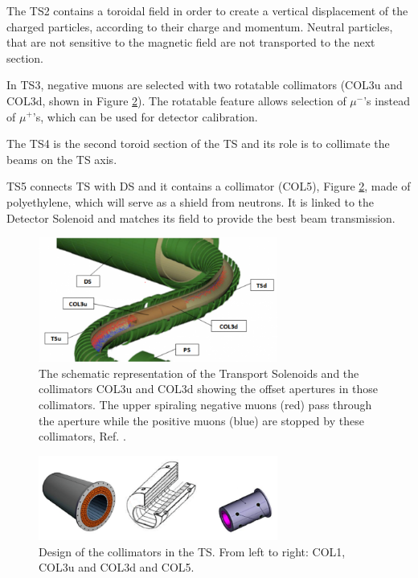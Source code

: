 The TS2 contains a toroidal field in order to create a 
vertical displacement of the charged particles,
according to their charge and momentum.
Neutral particles, that are not sensitive to the magnetic 
field are not transported to the next section.

In TS3, negative muons are selected with two rotatable collimators (COL3u and COL3d, 
shown in Figure \ref{fig:collimatorsshape}). 
The rotatable feature allows selection of $\mu^-$'s instead of $\mu^+$'s, which can 
be used for detector calibration. 

The TS4 is the second toroid section of the TS and its role is 
to collimate the beams on the TS axis.

TS5 connects TS with DS and it contains a collimator (COL5), 
Figure \ref{fig:collimatorsshape}, made of polyethylene, 
which will serve as a shield from neutrons. It is linked to the Detector 
Solenoid and matches its field to provide the best beam transmission.


\begin{figure}[!h]
    \centering
    \includegraphics[width =0.7\textwidth]{figures/png/800px-MuonBeamlineCollimators2.png}
    \caption[The Transport Solenoids and the collimators.]{The schematic representation of the Transport Solenoids and the collimators COL3u and 
    COL3d showing the offset apertures in those collimators. The 
    upper spiraling negative muons (red) pass through the aperture while 
    the positive muons (blue) are stopped by these collimators, Ref. \cite{tsview}.}
    \label{fig:collimators}
    \end{figure}
    \begin{figure}[!h]
        \centering
        \includegraphics[width =0.7\textwidth]{figures/png/Screenshot_20240706_120535.png}
        \caption[The design of the collimators in the TS.]{Design of the collimators in the TS. From left to right: COL1, COL3u and COL3d
        and COL5.}
        \label{fig:collimatorsshape}
        \end{figure}

